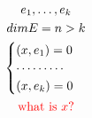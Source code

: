 \documentclass[12pt]{article}
\begin{document}
\begin{gather*}
	e_1, \ldots, e_k \\
	dim E = n > k \\
	\begin{cases}
		(x, e_1) = 0 \\ 
		\cdots \cdots \cdots \\ 
 		(x, e_k) = 0
	\end{cases} \\
	\color{red}{\text{what is } x?}
\end{gather*}
\end{document}
